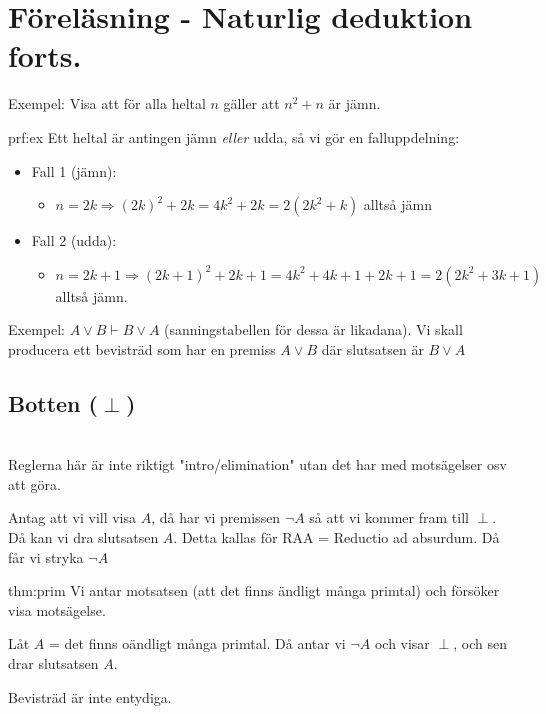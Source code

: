 \section{Föreläsning - Naturlig deduktion forts.}

\noindent Exempel: Visa att för alla heltal $n$ gäller att $n^2+n$ är jämn.
\par\bigskip

\begin{prf}[Exempel]{prf:ex}
  Ett heltal är antingen jämn \textit{eller} udda, så vi gör en falluppdelning:
  \begin{itemize}
    \item Fall 1 (jämn):
      \begin{itemize}
        \item $n=2k \Rightarrow (2k)^2+2k=4k^2+2k=2(2k^2+k)$ alltså jämn
      \end{itemize}
    \item Fall 2 (udda):
      \begin{itemize}
        \item $n=2k+1\Rightarrow (2k+1)^2+2k+1=4k^2+4k+1+2k+1=2(2k^2+3k+1)$ alltså jämn.
      \end{itemize}
  \end{itemize}
\end{prf}
\par\bigskip

\noindent Exempel: $A\vee B\vdash B\vee A$ (sanningstabellen för dessa är likadana). Vi skall producera ett bevisträd som har en premiss $A\vee B$ där slutsatsen är $B\vee A$
\par\bigskip

\subsection{Botten ($\perp$)}\hfill\\

\noindent Reglerna här är inte riktigt "intro/elimination" utan det har med motsägelser osv att göra.\par\bigskip

\noindent Antag att vi vill visa $A$, då har vi premissen $\neg A$ så att vi kommer fram till $\perp$. Då kan vi dra slutsatsen $A$. Detta kallas för RAA = Reductio ad absurdum. Då får vi stryka $\neg A$
\par\bigskip

\begin{prf}{thm:prim}
  Vi antar motsatsen (att det finns ändligt många primtal) och försöker visa motsägelse.
  \par\bigskip
  \noindent Låt $A$ = det finns oändligt många primtal. Då antar vi $\neg A$ och visar $\perp$, och sen drar slutsatsen $A$.
\end{prf}
\par\bigskip

\noindent Bevisträd är inte entydiga.
